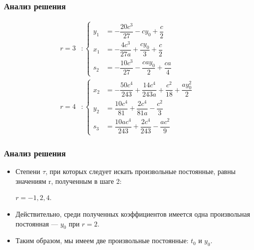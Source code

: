 \documentclass[hyperref={pdftex,unicode}]{beamer}
\begin{document}
\begin{frame}

\frametitle{Анализ решения}

$$
\begin{aligned}
r = 3 &:
\left\{
	\begin{aligned}
		y_1 &= -\dfrac{20c^3}{27} - cy_0 + \dfrac{c}{2} \\
		x_1 &= -\dfrac{4c^3}{27a} + \dfrac{cy_0}{3} + \dfrac{c}{2} \\
		s_2 &= -\dfrac{10c^3}{27} - \dfrac{cay_0}{2} + \dfrac{ca}{4}
	\end{aligned}
\right.
\\
r = 4 &: 
\left\{
	\begin{aligned}
		x_2 &= -\dfrac{50c^4}{243} + \dfrac{14c^4}{243a} + \dfrac{c^2}{18} + \dfrac{ay^2_0}{2}\\
		y_2 &= \dfrac{10c^4}{81} + \dfrac{2c^4}{81a} - \dfrac{c^2}{3} \\
		s_3 &= \dfrac{10ac^4}{243} + \dfrac{2c^4}{243} - \dfrac{ac^2}{9}
	\end{aligned}
\right.
\end{aligned}
$$

\end{frame}



\begin{frame}

\frametitle{Анализ решения}

\begin{itemize}

\item
Степени $ \tau $, при которых следует искать произвольные постоянные, равны значениям r, полученным в шаге 2: 
\begin{center}
$ r = -1, 2, 4. $ 
\end{center}

\item
Действительно, среди полученных коэффициентов имеется одна произвольная постоянная --- $ y_0 $ при $ r = 2 $.

\item
Таким образом, мы имеем две произвольные постоянные: $ t_0 $ и $ y_0 $.

\end{itemize}
\end{frame}
\end{document}
